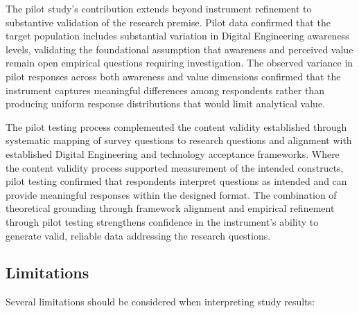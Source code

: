 The pilot study's contribution extends beyond instrument refinement to substantive validation of the research premise. Pilot data confirmed that the target population includes substantial variation in Digital Engineering awareness levels, validating the foundational assumption that awareness and perceived value remain open empirical questions requiring investigation. The observed variance in pilot responses across both awareness and value dimensions confirmed that the instrument captures meaningful differences among respondents rather than producing uniform response distributions that would limit analytical value.

The pilot testing process complemented the content validity established through systematic mapping of survey questions to research questions and alignment with established Digital Engineering and technology acceptance frameworks. Where the content validity process supported measurement of the intended constructs, pilot testing confirmed that respondents interpret questions as intended and can provide meaningful responses within the designed format. The combination of theoretical grounding through framework alignment and empirical refinement through pilot testing strengthens confidence in the instrument's ability to generate valid, reliable data addressing the research questions.

\subsection{Limitations}

Several limitations should be considered when interpreting study results:

